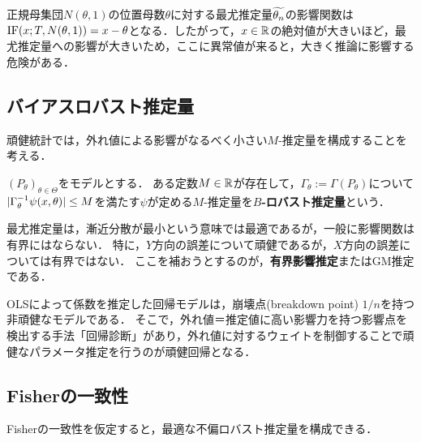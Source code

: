 \documentclass[uplatex,dvipdfmx]{jsreport}
\begin{document}
\begin{example}
    正規母集団$N(\theta,1)$の位置母数$\theta$に対する最尤推定量$\widetilde{\theta_n}$の影響関数は$\mathrm{IF}(x;T,N(\theta,1))=x-\theta$となる．したがって，$x\in\mathbb{R}$の絶対値が大きいほど，最尤推定量への影響が大きいため，ここに異常値が来ると，大きく推論に影響する危険がある．
\end{example}

\subsection{バイアスロバスト推定量}

\begin{tcolorbox}[colframe=ForestGreen, colback=ForestGreen!10!white,breakable,colbacktitle=ForestGreen!40!white,coltitle=black,fonttitle=\bfseries\sffamily,
title=]
    頑健統計では，外れ値による影響がなるべく小さい$M$-推定量を構成することを考える．
\end{tcolorbox}

\begin{definition}
    $(P_\theta)_{\theta\in\Theta}$をモデルとする．
    ある定数$M\in\mathbb{R}$が存在して，$\Gamma_\theta:=\Gamma(P_\theta)$について$\lvert\Gamma^{-1}_\theta\psi(x,\theta)\rvert\le M$を満たす$\psi$が定める$M$-推定量を\textbf{$B$-ロバスト推定量}という．
\end{definition}

\begin{example}[最尤推定]
    最尤推定量は，漸近分散が最小という意味では最適であるが，一般に影響関数は有界にはならない．
    特に，$Y$方向の誤差について頑健であるが，$X$方向の誤差については有界ではない．
    ここを補おうとするのが，\textbf{有界影響推定}またはGM推定である．
\end{example}

\begin{example}[]
    OLSによって係数を推定した回帰モデルは，崩壊点(breakdown point) $1/n$を持つ非頑健なモデルである．
    そこで，外れ値＝推定値に高い影響力を持つ影響点を検出する手法「回帰診断」があり，外れ値に対するウェイトを制御することで頑健なパラメータ推定を行うのが頑健回帰となる．
\end{example}

\subsection{Fisherの一致性}

\begin{tcolorbox}[colframe=ForestGreen, colback=ForestGreen!10!white,breakable,colbacktitle=ForestGreen!40!white,coltitle=black,fonttitle=\bfseries\sffamily,
title=]
    Fisherの一致性を仮定すると，最適な不偏ロバスト推定量を構成できる．
\end{tcolorbox}
\end{document}

